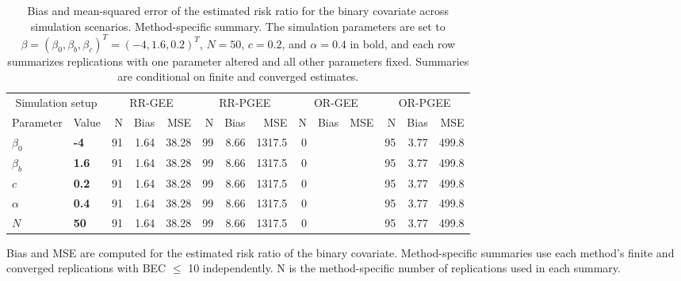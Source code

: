 \begin{table}[htbp]
\centering
\scriptsize
\setlength{\tabcolsep}{4pt}
\renewcommand{\arraystretch}{1.15}
\caption{Bias and mean-squared error of the estimated risk ratio for the binary covariate across simulation scenarios. Method-specific summary. The simulation parameters are set to $\beta = (\beta_0, \beta_b, \beta_c)^T = (-4, 1.6, 0.2)^T$, $N = 50$, $c = 0.2$, and $\alpha = 0.4$ in bold, and each row summarizes replications with one parameter altered and all other parameters fixed. Summaries are conditional on finite and converged estimates.}
\begin{tabular}{ll|rrr|rrr|rrr|rrr}
\hline
\multicolumn{2}{c|}{Simulation setup} & \multicolumn{3}{c|}{RR-GEE} & \multicolumn{3}{c|}{RR-PGEE} & \multicolumn{3}{c|}{OR-GEE} & \multicolumn{3}{c}{OR-PGEE} \\
Parameter & Value & N & Bias & MSE & N & Bias & MSE & N & Bias & MSE & N & Bias & MSE \\
\hline
$\beta_0$ & \textbf{-4} & 91 & 1.64 & 38.28 & 99 & 8.66 & 1317.5 & 0 &  &  & 95 & 3.77 & 499.8 \\
\hline
$\beta_b$ & \textbf{1.6} & 91 & 1.64 & 38.28 & 99 & 8.66 & 1317.5 & 0 &  &  & 95 & 3.77 & 499.8 \\
\hline
$c$ & \textbf{0.2} & 91 & 1.64 & 38.28 & 99 & 8.66 & 1317.5 & 0 &  &  & 95 & 3.77 & 499.8 \\
\hline
$\alpha$ & \textbf{0.4} & 91 & 1.64 & 38.28 & 99 & 8.66 & 1317.5 & 0 &  &  & 95 & 3.77 & 499.8 \\
\hline
$N$ & \textbf{50} & 91 & 1.64 & 38.28 & 99 & 8.66 & 1317.5 & 0 &  &  & 95 & 3.77 & 499.8 \\
\hline
\end{tabular}
\begin{flushleft}
\footnotesize Bias and MSE are computed for the estimated risk ratio of the binary covariate. Method-specific summaries use each method's finite and converged replications with BEC $\leq$ 10 independently. N is the method-specific number of replications used in each summary.
\end{flushleft}
\end{table}
